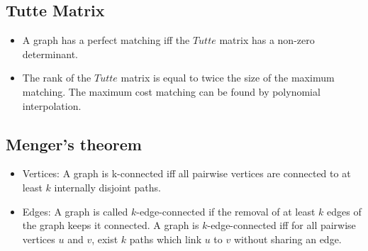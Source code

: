 \subsection{Tutte Matrix}
	\begin{itemize}
	\item A graph has a perfect matching iff the $Tutte$ matrix has a non-zero determinant.

	\item The rank of the $Tutte$ matrix is equal to twice the size of the maximum matching. The maximum cost matching can be found by polynomial interpolation.
	\end{itemize}

\subsection{Menger's theorem}
\begin{itemize}
\item Vertices: A graph is k-connected iff all pairwise vertices 
	are connected to at least $k$ internally disjoint paths.

\item Edges: A graph is called $k$-edge-connected if the removal of at 
	least $k$ edges of the graph keeps it connected. A graph is 
	$k$-edge-connected iff for all pairwise vertices $u$ and $v$,  
	exist $k$ paths which link $u$ to $v$ without sharing an edge.
\end{itemize}




